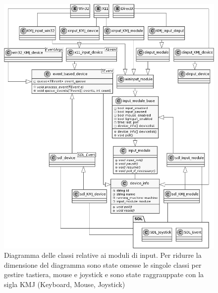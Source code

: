 \newpage
\begin{figure}[H]
	\includegraphics[width=\linewidth]{immagini/class_input}
	\caption{Diagramma delle classi relative ai moduli di input. Per ridurre la dimensione del diagramma sono state omesse le singole classi per gestire tastiera, mouse e joystick e sono state raggrauppate con la sigla KMJ (Keyboard, Mouse, Joystick)}
	\label{fig:class_input}
\end{figure}

